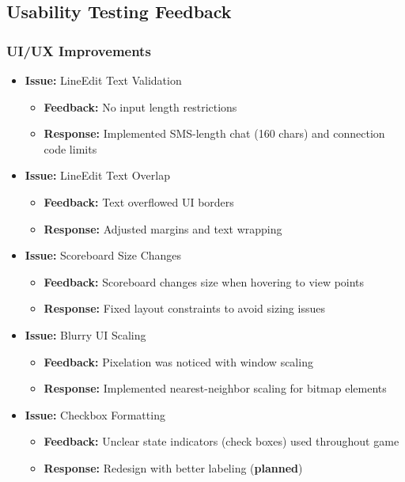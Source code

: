 \documentclass{article}
\begin{document}

\subsection{Usability Testing Feedback}

\subsubsection{UI/UX Improvements}
\begin{itemize}
    \item \textbf{Issue:} LineEdit Text Validation
    \begin{itemize}
        \item \textbf{Feedback:} No input length restrictions
        \item \textbf{Response:} Implemented SMS-length chat (160 chars) and connection code limits
    \end{itemize}
    
    \item \textbf{Issue:} LineEdit Text Overlap
    \begin{itemize}
        \item \textbf{Feedback:} Text overflowed UI borders
        \item \textbf{Response:} Adjusted margins and text wrapping
    \end{itemize}
    
    \item \textbf{Issue:} Scoreboard Size Changes
    \begin{itemize}
        \item \textbf{Feedback:} Scoreboard changes size when hovering to view points
        \item \textbf{Response:} Fixed layout constraints to avoid sizing issues
    \end{itemize}
    
    \item \textbf{Issue:} Blurry UI Scaling
    \begin{itemize}
        \item \textbf{Feedback:} Pixelation was noticed with window scaling
        \item \textbf{Response:} Implemented nearest-neighbor scaling for bitmap elements
    \end{itemize}
    
    \item \textbf{Issue:} Checkbox Formatting
    \begin{itemize}
        \item \textbf{Feedback:} Unclear state indicators (check boxes) used throughout game
        \item \textbf{Response:} Redesign with better labeling (\textbf{planned})
    \end{itemize}
\end{itemize}
\end{document}
